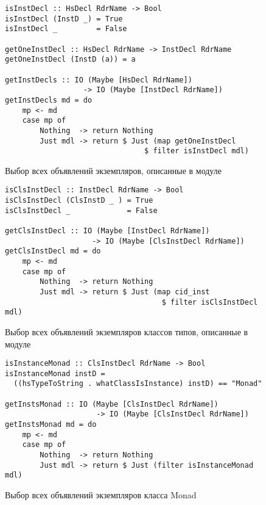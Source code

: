 \begin{figure}[h]
\hrulefill
\begin{lstlisting}
isInstDecl :: HsDecl RdrName -> Bool
isInstDecl (InstD _) = True
isInstDecl _         = False

getOneInstDecl :: HsDecl RdrName -> InstDecl RdrName
getOneInstDecl (InstD (a)) = a

getInstDecls :: IO (Maybe [HsDecl RdrName]) 
                  -> IO (Maybe [InstDecl RdrName])
getInstDecls md = do
    mp <- md
    case mp of 
        Nothing  -> return Nothing
        Just mdl -> return $ Just (map getOneInstDecl
                                $ filter isInstDecl mdl)
\end{lstlisting}
\hrulefill
\caption{Выбор всех объявлений экземпляров, описанные в модуле}\label{p2}
\end{figure}

\begin{figure}[h]
\hrulefill
\begin{lstlisting}
isClsInstDecl :: InstDecl RdrName -> Bool
isClsInstDecl (ClsInstD _ ) = True
isClsInstDecl _             = False

getClsInstDecl :: IO (Maybe [InstDecl RdrName]) 
                    -> IO (Maybe [ClsInstDecl RdrName])
getClsInstDecl md = do
    mp <- md
    case mp of
        Nothing  -> return Nothing
        Just mdl -> return $ Just (map cid_inst 
                                    $ filter isClsInstDecl mdl)
\end{lstlisting}
\hrulefill
\caption{Выбор всех объявлений экземпляров классов типов, описанные в модуле}\label{p3}
\end{figure}

\begin{figure}[h]
\hrulefill
\begin{lstlisting}
isInstanceMonad :: ClsInstDecl RdrName -> Bool
isInstanceMonad instD = 
  ((hsTypeToString . whatClassIsInstance) instD) == "Monad"

getInstsMonad :: IO (Maybe [ClsInstDecl RdrName])
                     -> IO (Maybe [ClsInstDecl RdrName])
getInstsMonad md = do
    mp <- md
    case mp of
        Nothing  -> return Nothing
        Just mdl -> return $ Just (filter isInstanceMonad mdl)
\end{lstlisting}
\hrulefill
\caption{Выбор всех объявлений экземпляров класса Monad}\label{p4}
\end{figure}

